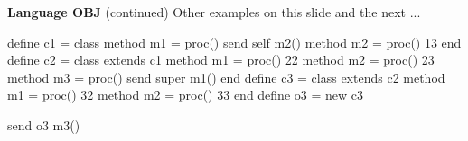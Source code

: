 \begin{minipage}[t]{\sw}
\slidenumber
\LARGE
{\bf Language OBJ} (continued)\exx
Other examples on this slide and the next ...
\Large
\begin{qv}
define c1 =
  class
    method m1 = proc() send self m2()
    method m2 = proc() 13
  end
define c2 =
  class extends c1
    method m1 = proc() 22
    method m2 = proc() 23
    method m3 = proc() send super m1()
  end
define c3 =
  class extends c2
    method m1 = proc() 32
    method m2 = proc() 33
  end
define o3 = new c3

send o3 m3()  %
\end{qv}
\end{minipage}

